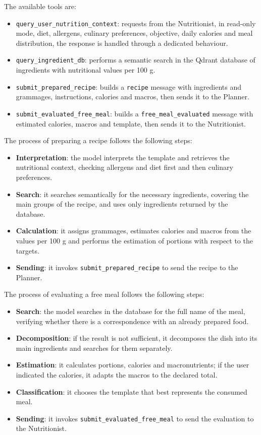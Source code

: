\documentclass[12pt,a4paper]{article}
\begin{document}
The available tools are:

\begin{itemize}
    \item \texttt{query\_user\_nutrition\_context}: requests from the Nutritionist, in read-only mode, diet, allergens, culinary preferences, objective, daily calories and meal distribution, the response is handled through a dedicated behaviour.
    \item \texttt{query\_ingredient\_db}: performs a semantic search in the Qdrant database of ingredients with nutritional values per 100 g.
    \item \texttt{submit\_prepared\_recipe}: builds a \texttt{recipe} message with ingredients and grammages, instructions, calories and macros, then sends it to the Planner.
    \item \texttt{submit\_evaluated\_free\_meal}: builds a \texttt{free\_meal\_evaluated} message with estimated calories, macros and template, then sends it to the Nutritionist.
\end{itemize}

The process of preparing a recipe follows the following steps:

\begin{itemize}
    \item \textbf{Interpretation}: the model interprets the template and retrieves the nutritional context, checking allergens and diet first and then culinary preferences.
    \item \textbf{Search}: it searches semantically for the necessary ingredients, covering the main groups of the recipe, and uses only ingredients returned by the database.
    \item \textbf{Calculation}: it assigns grammages, estimates calories and macros from the values per 100 g and performs the estimation of portions with respect to the targets.
    \item \textbf{Sending}: it invokes \texttt{submit\_prepared\_recipe} to send the recipe to the Planner.
\end{itemize}

The process of evaluating a free meal follows the following steps:

\begin{itemize}
    \item \textbf{Search}: the model searches in the database for the full name of the meal, verifying whether there is a correspondence with an already prepared food.
    \item \textbf{Decomposition}: if the result is not sufficient, it decomposes the dish into its main ingredients and searches for them separately.
    \item \textbf{Estimation}: it calculates portions, calories and macronutrients; if the user indicated the calories, it adapts the macros to the declared total.
    \item \textbf{Classification}: it chooses the template that best represents the consumed meal.
    \item \textbf{Sending}: it invokes \texttt{submit\_evaluated\_free\_meal} to send the evaluation to the Nutritionist.
\end{itemize}
\end{document}
